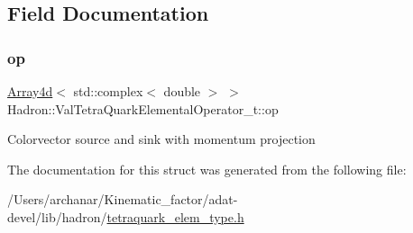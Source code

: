 \subsection{Field Documentation}
\mbox{\label{structHadron_1_1ValTetraQuarkElementalOperator__t_aa84effaf85576ba8df20869ed465a59e}} 
\subsubsection{\texorpdfstring{op}{op}}
{\footnotesize\ttfamily \mbox{\hyperlink{classXMLArray_1_1Array4d}{Array4d}}$<$ std\+::complex$<$ double $>$ $>$ Hadron\+::\+Val\+Tetra\+Quark\+Elemental\+Operator\+\_\+t\+::op}

Colorvector source and sink with momentum projection 

The documentation for this struct was generated from the following file\+:\begin{DoxyCompactItemize}
\item 
/\+Users/archanar/\+Kinematic\+\_\+factor/adat-\/devel/lib/hadron/\mbox{\hyperlink{adat-devel_2lib_2hadron_2tetraquark__elem__type_8h}{tetraquark\+\_\+elem\+\_\+type.\+h}}\end{DoxyCompactItemize}
